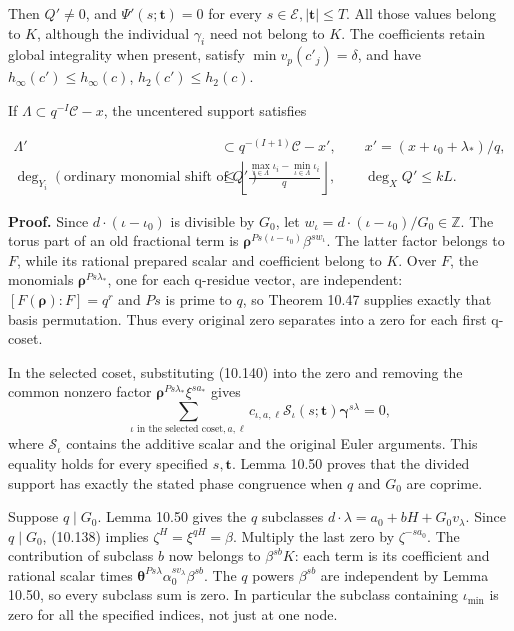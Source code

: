 \documentclass[
  11pt,
  a4paper,
]{article}
\begin{document}
Then \(Q'\ne0\), and \(\Psi'(s;\boldsymbol t)=0\) for every
\(s\in\mathcal E,|\boldsymbol t|\le T\). All those values belong to
\(K\), although the individual \(\gamma_i\) need not belong to \(K\).
The coefficients retain global integrality when present, satisfy
\(\min v_p(c'_j)=\delta\), and have \(h_\infty(c')\le h_\infty(c)\),
\(h_2(c')\le h_2(c)\).

If \(\Lambda\subset q^{-I}\mathcal C-x\), the uncentered support
satisfies

\[
\begin{aligned}
\Lambda'&\subset q^{-(I+1)}\mathcal C-x',
\qquad x'=(x+\iota_0+\lambda_*)/q,\\
\deg_{Y_i}(\text{ordinary monomial shift of }Q')
&\le
\left\lfloor\frac{\max_{\iota\in\Lambda}\iota_i-
\min_{\iota\in\Lambda}\iota_i}{q}\right\rfloor,
\qquad \deg_XQ'\le kL .
\end{aligned}
\tag{10.142}
\]

\textbf{Proof.} Since \(d\cdot(\iota-\iota_0)\) is divisible by \(G_0\),
let \(w_\iota=d\cdot(\iota-\iota_0)/G_0\in\mathbb Z\). The torus part of
an old fractional term is
\(\boldsymbol\rho^{Ps(\iota-\iota_0)}\beta^{s w_\iota}\). The latter
factor belongs to \(F\), while its rational prepared scalar and
coefficient belong to \(K\). Over \(F\), the monomials
\(\boldsymbol\rho^{Ps\lambda_*}\), one for each q-residue vector, are
independent: \([F(\boldsymbol\rho):F]=q^r\) and \(Ps\) is prime to
\(q\), so Theorem 10.47 supplies exactly that basis permutation. Thus
every original zero separates into a zero for each first q-coset.

In the selected coset, substituting (10.140) into the zero and removing
the common nonzero factor \(\boldsymbol\rho^{Ps\lambda_*}\xi^{s a_*}\)
gives \[
\sum_{\iota\text{ in the selected coset},a,\ell}
c_{\iota,a,\ell}\mathcal S_\iota(s;\boldsymbol t)
\boldsymbol\gamma^{s\lambda}=0,
\] where \(\mathcal S_\iota\) contains the additive scalar and the
original Euler arguments. This equality holds for every specified
\(s,\boldsymbol t\). Lemma 10.50 proves that the divided support has
exactly the stated phase congruence when \(q\) and \(G_0\) are coprime.

Suppose \(q\mid G_0\). Lemma 10.50 gives the \(q\) subclasses
\(d\cdot\lambda=a_0+bH+G_0v_\lambda\). Since \(q\mid G_0\), (10.138)
implies \(\zeta^H=\xi^{qH}=\beta\). Multiply the last zero by
\(\zeta^{-s a_0}\). The contribution of subclass \(b\) now belongs to
\(\beta^{sb}K\): each term is its coefficient and rational scalar times
\(\boldsymbol\theta^{Ps\lambda}\alpha_0^{s v_\lambda}\beta^{sb}\). The
\(q\) powers \(\beta^{sb}\) are independent by Lemma 10.50, so every
subclass sum is zero. In particular the subclass containing
\(\iota_{\min}\) is zero for all the specified indices, not just at one
node.
\end{document}
